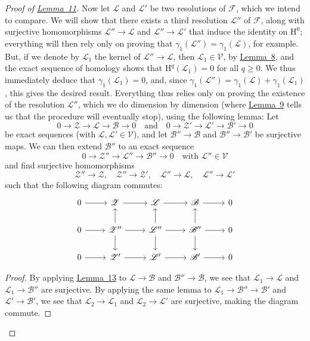 \documentclass{article}
\theoremstyle{plain}
\newenvironment{lemma}[1]
    {\renewcommand\theinnerlemma{#1}\innerlemma}
    {\endinnerlemma}
\theoremstyle{definition}
\newcommand{\scr}[1]{{\mathscr{#1}}}
\renewcommand{\cal}[1]{{\mathcal{#1}}}
\newcommand{\HH}{\mathrm{H}}
\renewcommand{\geq}{\geqslant}
\newcommand{\oldpage}[1]{\marginpar{\footnotesize$\Big\vert$ \textit{p.~#1}}}
\begin{document}
\begin{proof}[Proof of {\hyperref[lemma11]{Lemma~11}}]
  Now let $\scr{L}$ and $\scr{L}'$ be two resolutions of $\scr{F}$, which we intend to compare.
  We will show that there exists a third resolution $\scr{L}''$ of $\scr{F}$, along with surjective homomorphisms $\scr{L}''\to\scr{L}$ and $\scr{L}''\to\scr{L}'$ that induce the identity on $\HH^0$;
  everything will then rely only on proving that $\gamma_1(\scr{L}'')=\gamma_1(\scr{L})$, for example.
  But, if we denote by $\scr{L}_1$ the kernel of $\scr{L}''\to\scr{L}$, then $\scr{L}_1\in\cal{V}$, by \hyperref[lemma8]{Lemma~8}, and the exact sequence of homology shows that $\HH^q(\scr{L}_1)=0$ for all $q\geq0$.
  We thus immediately deduce that $\gamma_1(\scr{L}_1)=0$, and, since $\gamma_1(\scr{L}'')=\gamma_1(\scr{L})+\gamma_1(\scr{L}_1)$, this gives the desired result.
  Everything thus relies only on proving the existence of the resolution $\scr{L}''$, which we do dimension by dimension (where \hyperref[lemma9]{Lemma~9} tells us that the procedure will eventually stop), using the following lemma:
  \begin{lemma}{14}
  \label{lemma14}
    Let
    \[
      0\to\scr{Z}\to\scr{L}\to\scr{B}\to0
      \quad\text{and}\quad
      0\to\scr{Z}'\to\scr{L}'\to\scr{B}'\to0
    \]
    be exact sequences (with $\scr{L},\scr{L}'\in\cal{V}$), and let $\scr{B}''\to\scr{B}$ and $\scr{B}''\to\scr{B}'$ be surjective maps.
    We can then extend $\scr{B}''$ to an exact sequence
    \[
      0\to\scr{Z}''\to\scr{L}''\to\scr{B}''\to0
      \quad
      \mbox{with $\scr{L}''\in\cal{V}$}
    \]
    and find surjective homomorphisms
    \[
      \scr{Z}''\to\scr{Z},
      \quad
      \scr{Z}''\to\scr{Z}',
      \quad
      \scr{L}''\to\scr{L},
      \quad
      \scr{L}''\to\scr{L}'
    \]
    such that the following diagram commutes:
    \[
      \begin{tikzcd}
        0 \rar
        & \scr{Z} \rar
        & \scr{L} \rar
        & \scr{B} \rar
        & 0
      \\0 \rar
        & \scr{Z}'' \rar \uar \dar
        & \scr{L}'' \rar \uar \dar
        & \scr{B}'' \rar \uar \dar
        & 0
      \\0 \rar
        & \scr{Z}' \rar
        & \scr{L}' \rar
        & \scr{B}' \rar
        & 0
      \end{tikzcd}
    \]
  \end{lemma}
  \begin{proof}
\oldpage{108}
    By applying \hyperref[lemma13]{Lemma~13} to $\scr{L}\to\scr{B}$ and $\scr{B}''\to\scr{B}$, we see that $\scr{L}_1\to\scr{L}$ and $\scr{L}_1\to\scr{B}''$ are surjective.
    By applying the same lemma to $\scr{L}_1\to\scr{B}''\to\scr{B}'$ and $\scr{L}'\to\scr{B}'$, we see that $\scr{L}_2\to\scr{L}_1$ and $\scr{L}_2\to\scr{L}'$ are surjective, making the diagram commute.


\end{proof}
\end{proof}
\end{document}
